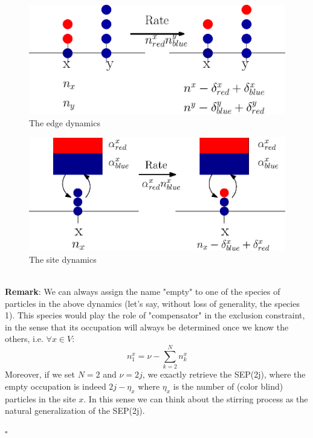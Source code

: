 \documentclass[11pt]{article}
\numberwithin{equation}{subsection}
\newcommand{\twoj}{\nu}
\begin{document}
\begin{figure}
    \centering
    \includegraphics[scale=0.6]{Dyn_stir.eps}
    \caption{The edge dynamics}
    \label{fig:1}
\end{figure}
\begin{figure}
    \centering
    \includegraphics[scale=0.88]{Dyn_stir_bordo.eps}
    \caption{The site dynamics}
    \label{fig:2}
\end{figure}\newline \\
\textbf{Remark}: 
    We can always assign the name "empty" to one of the species of particles in the above dynamics (let's say, without loss of generality, the species 1). This species would play the role of "compensator" in the exclusion constraint, in the sense that its occupation will always be determined once we know the others, i.e. $\forall x\in V$: 
    \begin{equation}
        n_{1}^{x}=\twoj-\sum_{k=2}^{N}n_{k}^{x}
    \end{equation}
    Moreover, if we set $N=2$ and $\twoj=2j$, we exactly retrieve the SEP(2j), where the empty occupation is indeed $2j-\eta_{x}$ where $\eta_{x}$ is the number of (color blind) particles in the site $x$. In this sense we can think about the stirring process as the natural generalization of the SEP(2j).
    \begin{flushright}
        $\square$
    \end{flushright}
\end{document}

